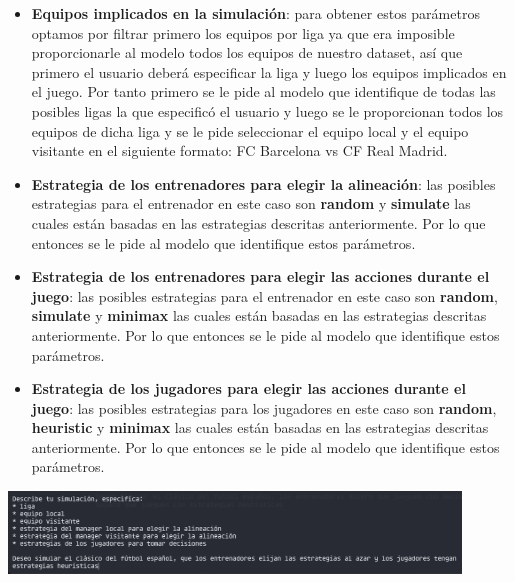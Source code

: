 \documentclass{article}
\begin{document}
\begin{itemize}
      \item \textbf{Equipos implicados en la simulación}: para obtener estos parámetros optamos por filtrar primero los
            equipos por liga ya que era imposible proporcionarle al modelo todos los equipos de nuestro dataset, así que primero
            el usuario deberá especificar la liga y luego los equipos implicados en el juego. Por tanto primero se le pide al
            modelo que identifique de todas las posibles ligas la que especificó el usuario y luego se le proporcionan todos
            los equipos de dicha liga y se le pide seleccionar el equipo local y el equipo visitante en el siguiente formato:
            FC Barcelona vs CF Real Madrid.
            
      \item \textbf{Estrategia de los entrenadores para elegir la alineación}: las posibles estrategias para el entrenador en este
            caso son \textbf{random} y \textbf{simulate} las cuales están basadas en las estrategias descritas anteriormente. Por lo
            que entonces se le pide al modelo que identifique estos parámetros.
            
      \item \textbf{Estrategia de los entrenadores para elegir las acciones durante el juego}: las posibles estrategias para el entrenador en este
            caso son \textbf{random}, \textbf{simulate} y \textbf{minimax} las cuales están basadas en las estrategias descritas anteriormente. Por lo
            que entonces se le pide al modelo que identifique estos parámetros.
            
      \item \textbf{Estrategia de los jugadores para elegir las acciones durante el juego}: las posibles estrategias para los jugadores en este
            caso son \textbf{random}, \textbf{heuristic} y \textbf{minimax} las cuales están basadas en las estrategias descritas anteriormente. Por lo
            que entonces se le pide al modelo que identifique estos parámetros.
            
            
\end{itemize}

\includegraphics*[width=0.9\textwidth]{images/llm.png}
\bigskip
\end{document}
